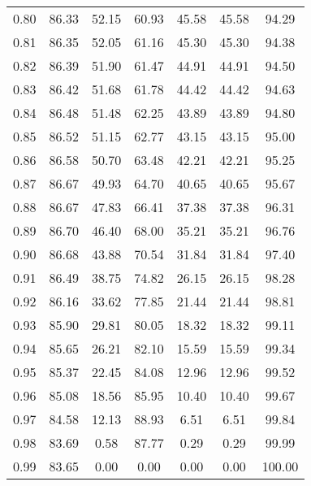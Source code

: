 \begin{tabular}{|c|c|c|c|c|c|c|}
      0.80 &     86.33 &     52.15 &      60.93 &   45.58 &      45.58 &         94.29 \\
      0.81 &     86.35 &     52.05 &      61.16 &   45.30 &      45.30 &         94.38 \\
      0.82 &     86.39 &     51.90 &      61.47 &   44.91 &      44.91 &         94.50 \\
      0.83 &     86.42 &     51.68 &      61.78 &   44.42 &      44.42 &         94.63 \\
      0.84 &     86.48 &     51.48 &      62.25 &   43.89 &      43.89 &         94.80 \\
      0.85 &     86.52 &     51.15 &      62.77 &   43.15 &      43.15 &         95.00 \\
      0.86 &     86.58 &     50.70 &      63.48 &   42.21 &      42.21 &         95.25 \\
      0.87 &     86.67 &     49.93 &      64.70 &   40.65 &      40.65 &         95.67 \\
      0.88 &     86.67 &     47.83 &      66.41 &   37.38 &      37.38 &         96.31 \\
      0.89 &     86.70 &     46.40 &      68.00 &   35.21 &      35.21 &         96.76 \\
      0.90 &     86.68 &     43.88 &      70.54 &   31.84 &      31.84 &         97.40 \\
      0.91 &     86.49 &     38.75 &      74.82 &   26.15 &      26.15 &         98.28 \\
      0.92 &     86.16 &     33.62 &      77.85 &   21.44 &      21.44 &         98.81 \\
      0.93 &     85.90 &     29.81 &      80.05 &   18.32 &      18.32 &         99.11 \\
      0.94 &     85.65 &     26.21 &      82.10 &   15.59 &      15.59 &         99.34 \\
      0.95 &     85.37 &     22.45 &      84.08 &   12.96 &      12.96 &         99.52 \\
      0.96 &     85.08 &     18.56 &      85.95 &   10.40 &      10.40 &         99.67 \\
      0.97 &     84.58 &     12.13 &      88.93 &    6.51 &       6.51 &         99.84 \\
      0.98 &     83.69 &      0.58 &      87.77 &    0.29 &       0.29 &         99.99 \\
      0.99 &     83.65 &      0.00 &       0.00 &    0.00 &       0.00 &        100.00 \\
\bottomrule
\end{tabular}
